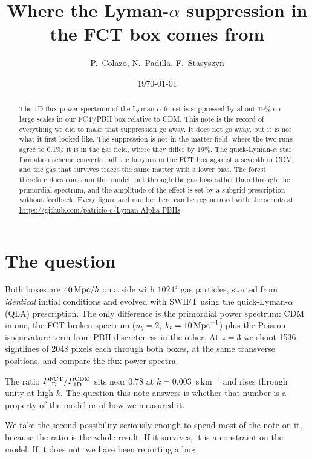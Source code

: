\documentclass[11pt,a4paper]{article}
\title{Where the Lyman-$\alpha$ suppression in the FCT box comes from}
\author{P.~Colazo, N.~Padilla, F.~Stasyszyn}
\date{\today}
\newcommand{\kv}{\ensuremath{\mathrm{s\,km^{-1}}}}
\newcommand{\Pod}{\ensuremath{P_{\rm 1D}}}
\begin{document}
\maketitle

\begin{abstract}
The 1D flux power spectrum of the Lyman-$\alpha$ forest is suppressed by
about $19\%$ on large scales in our FCT/PBH box relative to CDM. This note
is the record of everything we did to make that suppression go away. It
does not go away, but it is not what it first looked like. The suppression
is not in the matter field, where the two runs agree to $0.1\%$; it is in
the gas field, where they differ by $19\%$. The quick-Lyman-$\alpha$ star
formation scheme converts half the baryons in the FCT box against a seventh
in CDM, and the gas that survives traces the same matter with a lower bias.
The forest therefore does constrain this model, but through the gas bias
rather than through the primordial spectrum, and the amplitude of the
effect is set by a subgrid prescription without feedback. Every figure and
number here can be regenerated with the scripts at
\url{https://github.com/patricio-c/Lyman-Alpha-PBHs}.
\end{abstract}

\section{The question}

Both boxes are $40\,{\rm Mpc}/h$ on a side with $1024^3$ gas particles,
started from \emph{identical} initial conditions and evolved with SWIFT
using the quick-Lyman-$\alpha$ (QLA) prescription. The only difference is
the primordial power spectrum: CDM in one, the FCT broken spectrum
($n_b = 2$, $k_t = 10\,{\rm Mpc}^{-1}$) plus the Poisson isocurvature term
from PBH discreteness in the other. At $z=3$ we shoot 1536 sightlines of
2048 pixels each through both boxes, at the same transverse positions, and
compare the flux power spectra.

The ratio $\Pod^{\rm FCT}/\Pod^{\rm CDM}$ sits near $0.78$ at
$k = 0.003$~\kv{} and rises through unity at high $k$. The question this
note answers is whether that number is a property of the model or of how we
measured it.

We take the second possibility seriously enough to spend most of the note
on it, because the ratio is the whole result. If it survives, it is a
constraint on the model. If it does not, we have been reporting a bug.
\end{document}
